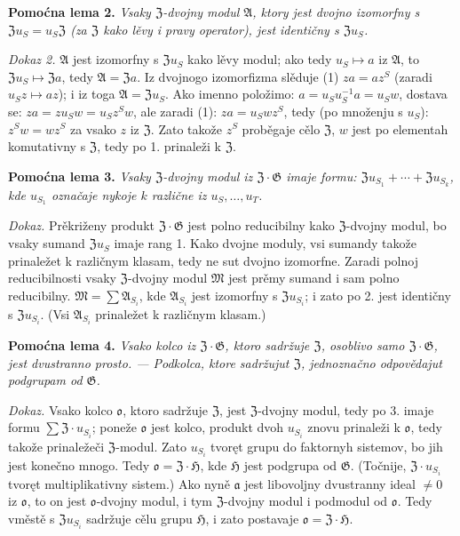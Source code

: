 \documentclass[11pt]{article}
\begin{document}
\noindent\textbf{Pomoćna lema 2.} \emph{Vsaky \(\mathfrak Z\)-dvojny modul \(\mathfrak A\), ktory jest dvojno izomorfny s \(\mathfrak Zu_S=u_S\mathfrak Z\) (za \(\mathfrak Z\) kako lěvy i pravy operator), jest identičny s \(\mathfrak Zu_S\).}

\noindent\emph{Dokaz 2.} \(\mathfrak A\) jest izomorfny s \(\mathfrak Zu_S\) kako lěvy modul; ako tedy \(u_S\mapsto a\) iz \(\mathfrak A\), to \(\mathfrak Zu_S\mapsto\mathfrak Za\), tedy \(\mathfrak A=\mathfrak Za\). Iz dvojnogo izomorfizma slěduje (1) \(za=az^S\) (zaradi \(u_Sz\mapsto az\)); i iz toga \(\mathfrak A=\mathfrak Zu_S\). Ako imenno položimo: \(a=u_Su_S^{-1}a=u_Sw\), dostava se: \(za=zu_Sw=u_Sz^Sw\), ale zaradi (1): \(za=u_Swz^S\), tedy (po množenju s \(u_S\)): \(z^Sw=wz^S\) za vsako \(z\) iz \(\mathfrak Z\). Zato takože \(z^S\) proběgaje cělo \(\mathfrak Z\), \(w\) jest po elementah komutativny s \(\mathfrak Z\), tedy po 1. prinaleži k \(\mathfrak Z\).

\noindent\textbf{Pomoćna lema 3.} \emph{Vsaky \(\mathfrak Z\)-dvojny modul iz \(\mathfrak Z\cdot\mathfrak G\) imaje formu: \(\mathfrak Zu_{S_1}+\cdots+\mathfrak Zu_{S_k}\), kde \(u_{S_1}\) označaje nykoje \(k\) različne iz \(u_S,\ldots,u_T\).}

\noindent\emph{Dokaz.} Prěkriženy produkt \(\mathfrak Z\cdot\mathfrak G\) jest polno reducibilny kako \(\mathfrak Z\)-dvojny modul, bo vsaky sumand \(\mathfrak Zu_S\) imaje rang 1. Kako dvojne moduly, vsi sumandy takože prinaležet k različnym klasam, tedy ne sut dvojno izomorfne. Zaradi polnoj reducibilnosti vsaky \(\mathfrak Z\)-dvojny modul \(\mathfrak M\) jest prěmy sumand i sam polno reducibilny. \(\mathfrak M=\sum\mathfrak A_{S_i}\), kde \(\mathfrak A_{S_i}\) jest izomorfny s \(\mathfrak Zu_{S_i}\); i zato po 2. jest identičny s \(\mathfrak Zu_{S_i}\). (Vsi \(\mathfrak A_{S_i}\) prinaležet k različnym klasam.)

\noindent\textbf{Pomoćna lema 4.} \emph{Vsako kolco iz \(\mathfrak Z\cdot\mathfrak G\), ktoro sadržuje \(\mathfrak Z\), osoblivo samo \(\mathfrak Z\cdot\mathfrak G\), jest dvustranno prosto. --- Podkolca, ktore sadržujut \(\mathfrak Z\), jednoznačno odpovědajut podgrupam od \(\mathfrak G\).}

\noindent\emph{Dokaz.} Vsako kolco \(\mathfrak o\), ktoro sadržuje \(\mathfrak Z\), jest \(\mathfrak Z\)-dvojny modul, tedy po 3. imaje formu \(\sum\mathfrak Z\cdot u_{S_i}\); poneže \(\mathfrak o\) jest kolco, produkt dvoh \(u_{S_i}\) znovu prinaleži k \(\mathfrak o\), tedy takože prinaležeči \(\mathfrak Z\)-modul. Zato \(u_{S_i}\) tvoręt grupu do faktornyh sistemov, bo jih jest konečno mnogo. Tedy \(\mathfrak o=\mathfrak Z\cdot\mathfrak H\), kde \(\mathfrak H\) jest podgrupa od \(\mathfrak G\). (Točnije, \(\mathfrak Z\cdot u_{S_i}\) tvoręt multiplikativny sistem.) Ako nyně \(\mathfrak a\) jest libovoljny dvustranny ideal \(\neq0\) iz \(\mathfrak o\), to on jest \(\mathfrak o\)-dvojny modul, i tym \(\mathfrak Z\)-dvojny modul i podmodul od \(\mathfrak o\). Tedy vměstě s \(\mathfrak Zu_{S_i}\) sadržuje cělu grupu \(\mathfrak H\), i zato postavaje \(\mathfrak o=\mathfrak Z\cdot\mathfrak H\).
\end{document}
